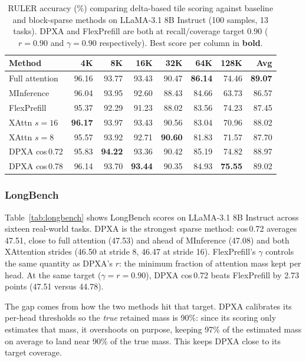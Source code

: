 \begin{table}[!ht]
\centering
\caption{RULER accuracy (\%) comparing delta-based tile scoring against baseline and block-sparse methods on LLaMA-3.1 8B Instruct (100 samples, 13 tasks). DPXA and FlexPrefill are both at recall/coverage target $0.90$ ($r{=}0.90$ and $\gamma{=}0.90$ respectively). Best score per column in \textbf{bold}.}
\label{tab:delta_tile_scoring}
\begin{tabular}{lrrrrrrr}
\toprule
Method & 4K & 8K & 16K & 32K & 64K & 128K & Avg \\
\midrule
Full attention              & 96.16 & 93.77 & 93.43 & 90.47 & \textbf{86.14} & 74.46 & \textbf{89.07} \\
MInference                  & 96.04 & 93.95 & 92.60 & 88.43 & 84.66 & 63.73 & 86.57 \\
FlexPrefill                  & 95.37 & 92.29 & 91.23 & 88.02 & 83.56 & 74.23 & 87.45 \\
\midrule
XAttn $s=16$                & \textbf{96.17} & 93.97 & 93.43 & 90.56 & 83.04 & 70.96 & 88.02 \\
XAttn $s=8$                 & 95.57 & 93.92 & 92.71 & \textbf{90.60} & 81.83 & 71.57 & 87.70 \\
\midrule
DPXA cos\,0.72 & 95.83 & \textbf{94.22} & 93.36 & 90.42 & 85.19 & 74.82 & 88.97 \\
DPXA cos\,0.78 & 96.14 & 93.70 & \textbf{93.44} & 90.35 & 84.93 & \textbf{75.55} & 89.02 \\
\bottomrule
\end{tabular}
\end{table}

\subsubsection{LongBench}
\label{sec:results_longbench}

Table~\ref{tab:longbench} shows LongBench scores on LLaMA-3.1 8B Instruct across sixteen real-world tasks. DPXA is the strongest sparse method: cos\,0.72 averages 47.51, close to full attention (47.53) and ahead of MInference (47.08) and both XAttention strides (46.50 at stride 8, 46.47 at stride 16). FlexPrefill's $\gamma$ controls the same quantity as DPXA's $r$: the minimum fraction of attention mass kept per head. At the same target ($\gamma{=}r{=}0.90$), DPXA cos\,0.72 beats FlexPrefill by 2.73 points (47.51 versus 44.78).

The gap comes from how the two methods hit that target. DPXA calibrates its per-head thresholds so the \emph{true} retained mass is 90\%: since its scoring only estimates that mass, it overshoots on purpose, keeping 97\% of the estimated mass on average to land near 90\% of the true mass. This keeps DPXA close to its target coverage.

